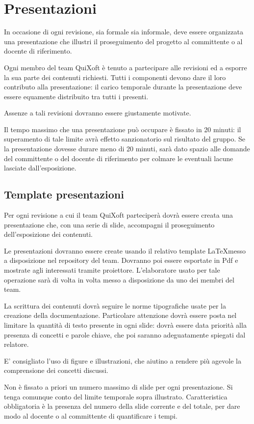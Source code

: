 \documentclass[11pt,a4paper]{article}
\begin{document}
\section{Presentazioni}
In occasione di ogni revisione, sia formale sia informale, deve essere organizzata una presentazione che illustri il proseguimento del progetto al committente o al docente di riferimento.

Ogni membro del team QuiXoft è tenuto a partecipare alle revisioni ed a esporre la sua parte dei contenuti richiesti.
Tutti i componenti devono dare il loro contributo alla presentazione: il carico temporale durante la presentazione deve essere equamente distribuito tra tutti i presenti.

Assenze a tali revisioni dovranno essere giustamente motivate.

Il tempo massimo che una presentazione può occupare è fissato in 20 minuti: il superamento di tale limite avrà effetto sanzionatorio sul risultato del gruppo.
Se la presentazione dovesse durare meno di 20 minuti, sarà dato spazio alle domande del committente o del docente di riferimento per colmare le eventuali lacune lasciate dall'esposizione.
\subsection{Template presentazioni}
Per ogni revisione a cui il team QuiXoft parteciperà dovrà essere creata una presentazione che, con una serie di slide, accompagni il proseguimento dell'esposizione dei contenuti.

Le presentazioni dovranno essere create usando il relativo template \LaTeX \space messo a disposizione nel repository del team.
Dovranno poi essere esportate in Pdf e mostrate agli interessati tramite proiettore.
L'elaboratore usato per tale operazione sarà di volta in volta messo a disposizione da uno dei membri del team.

La scrittura dei contenuti dovrà seguire le norme tipografiche usate per la creazione della documentazione.
Particolare attenzione dovrà essere posta nel limitare la quantità di testo presente in ogni slide: dovrà essere data priorità alla presenza di concetti e parole chiave, che poi saranno adeguatamente spiegati dal relatore.

E' consigliato l'uso di figure e illustrazioni, che aiutino a rendere più agevole la comprensione dei concetti discussi.

Non è fissato a priori un numero massimo di slide per ogni presentazione. Si tenga comunque conto del limite temporale sopra illustrato.
Caratteristica obbligatoria è la presenza del numero della slide corrente e del totale, per dare modo al docente o al committente di quantificare i tempi.
\end{document}
